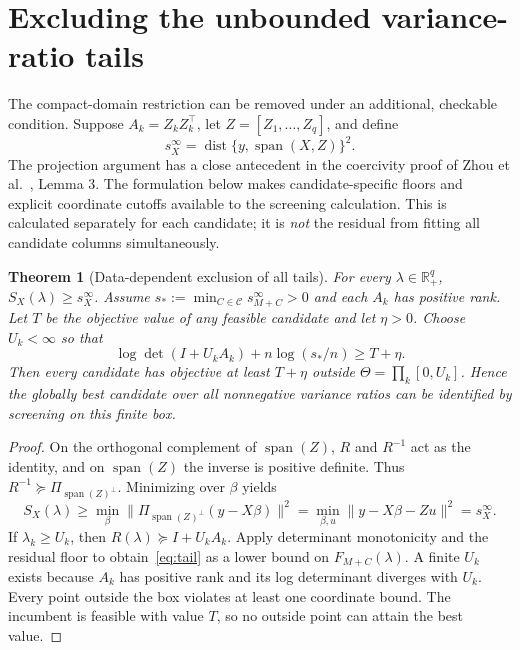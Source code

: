 \documentclass[11pt,a4paper]{article}
\newtheorem{theorem}{Theorem}
\theoremstyle{remark}\newtheorem{remark}[theorem]{Remark}
\newcommand{\R}{\mathbb R}
\newcommand{\Span}{\operatorname{span}}
\newcommand{\dist}{\operatorname{dist}}
\newcommand{\calC}{\mathcal C}
\begin{document}
\section{Excluding the unbounded variance-ratio tails}
The compact-domain restriction can be removed under an additional, checkable
condition. Suppose $A_k=Z_kZ_k^\top$, let $Z=[Z_1,\ldots,Z_q]$, and define
\begin{equation}
s_X^{\infty}=\dist\{y,\Span(X,Z)\}^2.
\end{equation}
The projection argument has a close antecedent in the coercivity proof of
Zhou et al.~\cite{zhou}, Lemma 3. The formulation below makes candidate-specific
floors and explicit coordinate cutoffs available to the screening calculation.
This is calculated separately for each candidate; it is \emph{not} the residual
from fitting all candidate columns simultaneously.

\begin{theorem}[Data-dependent exclusion of all tails]\label{thm:tail}
For every $\lambda\in\R_+^q$, $S_X(\lambda)\geq s_X^{\infty}$. Assume
$s_*:=\min_{C\in\calC}s_{M+C}^{\infty}>0$ and each $A_k$ has positive rank.
Let $T$ be the objective value of any feasible candidate and let $\eta>0$.
Choose $U_k<\infty$ so that
\begin{equation}\label{eq:tail}
\log\det(I+U_kA_k)+n\log(s_*/n)\geq T+\eta.
\end{equation}
Then every candidate has objective at least $T+\eta$ outside
$\Theta=\prod_k[0,U_k]$. Hence the globally best candidate over all nonnegative
variance ratios can be identified by screening on this finite box.
\end{theorem}
\begin{proof}
On the orthogonal complement of $\Span(Z)$, $R$ and $R^{-1}$ act as the identity,
and on $\Span(Z)$ the inverse is positive definite. Thus
$R^{-1}\succeq\Pi_{\Span(Z)^\perp}$. Minimizing over $\beta$ yields
\[
S_X(\lambda)\geq\min_{\beta}\|\Pi_{\Span(Z)^\perp}(y-X\beta)\|^2
=\min_{\beta,u}\|y-X\beta-Zu\|^2=s_X^{\infty}.
\]
If $\lambda_k\geq U_k$, then $R(\lambda)\succeq I+U_kA_k$. Apply determinant
monotonicity and the residual floor to obtain~\eqref{eq:tail} as a lower bound on
$F_{M+C}(\lambda)$. A finite $U_k$ exists because $A_k$ has positive rank and its
log determinant diverges with $U_k$. Every point outside the box violates at least
one coordinate bound. The incumbent is feasible with value $T$, so no outside point
can attain the best value.
\end{proof}
\end{document}
